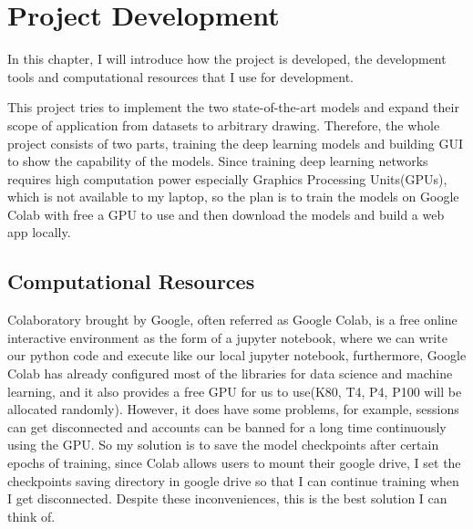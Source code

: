 \chapter{Project Development}
In this chapter, I will introduce how the project is developed,
the development tools and computational resources that I use for 
development.

This project tries to implement the two state-of-the-art models and 
expand their scope of application from datasets to arbitrary drawing.
Therefore, the whole project consists of two parts, training the deep 
learning models and building GUI to show the capability of the models.
Since training deep learning networks requires high computation power 
especially Graphics Processing Units(GPUs), which is not available to 
my laptop, so the plan is to train the models on Google Colab with 
free a GPU to use and then download the models and build a web app locally.

\section{Computational Resources}
Colaboratory brought by Google, often referred as Google Colab, is a 
free online interactive environment as the form of a jupyter notebook,
where we can write our python code and execute like our local jupyter 
notebook, furthermore, Google Colab has already configured most of the 
libraries for data science and machine learning, and it also provides 
a free GPU for us to use(K80, T4, P4, P100 will be allocated randomly).
However, it does have some problems, for example, sessions can get 
disconnected and accounts can be banned for a long time continuously 
using the GPU. So my solution is to save the model checkpoints after 
certain epochs of training, since Colab allows users to mount their google drive, 
I set the checkpoints saving directory in google drive so that I can 
continue training when I get disconnected.
Despite these inconveniences, this is the best solution 
I can think of. 

